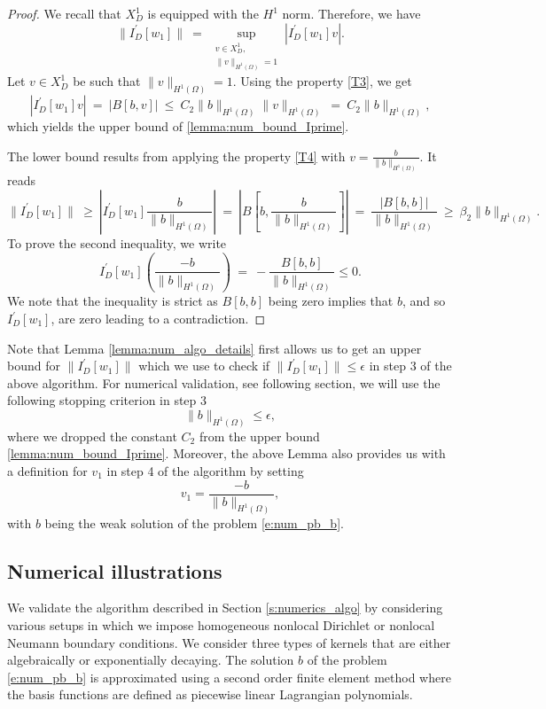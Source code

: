 \documentclass[11pt]{amsart}   	%
\theoremstyle{plain}
\numberwithin{equation}{section}
\begin{document}
\begin{proof}
We recall that $X_D^1$ is equipped with the $H^1$ norm. Therefore, we have
$$\|I_D^\prime[w_1]\| \ = \ \sup_{\substack{v \in X_D^1,\\ \|v\|_{H^1(\Omega)} =1}} |I_D^\prime[w_1] v|.$$
Let $v\in X_D^1$ be such that $\|v\|_{H^1(\Omega)}=1$. Using the property \ref{T3}, we get
$$ |I_D^\prime[w_1] v|
\ = \ \left| B[b,v] \right|
\ \leq \ C_2 \| b \|_{H^1(\Omega)} \| v\|_{H^1(\Omega)}
\ = \ C_2 \| b \|_{H^1(\Omega)}
,$$
which yields the upper bound of \ref{lemma:num_bound_Iprime}.

The lower bound results from applying the property \ref{T4} with $v=\frac{b}{\|b\|_{H^1(\Omega)}}$. It reads
$$ \| I_D^\prime[w_1] \| 
\ \geq \ \left| I_D^\prime[w_1] \frac{b}{\|b\|_{H^1(\Omega)}} \right| 
\ = \ \left| B\left[ b, \frac{b}{\|b\|_{H^1(\Omega)}}\right] \right|
\ = \ \frac{| B[b,b] |}{\| b\|_{H^1(\Omega)} }
\ \geq \ \beta_2 \| b\|_{H^1(\Omega)}.
$$
To prove the second inequality, we write
$$I_D^\prime[w_1] \left( \frac{-b}{\|b\|_{H^1(\Omega)}}\right)
\ = \ - \frac{ B[b, b] }{\|b\|_{H^1(\Omega)}} \leq 0.
$$
We note that the inequality is strict as $B[b,b]$ being zero implies that $b$, and so $I_D^\prime[w_1]$, are zero leading to a contradiction.
\end{proof}

Note that Lemma \ref{lemma:num_algo_details} first allows us to get an upper bound for $\|I_D^\prime[w_1]\|$ which we use to check if $\|I_D^\prime[w_1]\| \leq \epsilon$ in step 3 of the above algorithm. For numerical validation, see following section, we will use the following stopping criterion in step 3
$$\|b\|_{H^1(\Omega)} \leq \epsilon,$$
where we dropped the constant $C_2$ from the upper bound \ref{lemma:num_bound_Iprime}.
Moreover, the above Lemma also provides us with a definition for $v_1$ in step 4 of the algorithm by setting
$$v_1 = \frac{-b}{\|b\|_{H^1(\Omega)}},$$
with $b$ being the weak solution of the problem \ref{e:num_pb_b}.


\subsection{Numerical illustrations}\label{s:numerics_results}
We validate the algorithm described in Section \ref{s:numerics_algo} by considering various setups in which we impose homogeneous nonlocal Dirichlet or nonlocal Neumann boundary conditions. We consider three types of kernels that are either algebraically or exponentially decaying. The solution $b$ of the problem \ref{e:num_pb_b} is approximated using a second order finite element method where the basis functions are defined as piecewise linear Lagrangian polynomials.
\end{document}
